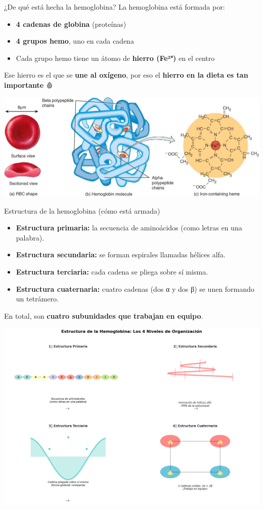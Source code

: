 \documentclass[
  ignorenonframetext,
]{beamer}
\providecommand{\tightlist}{%
  \setlength{\itemsep}{0pt}\setlength{\parskip}{0pt}}
\begin{document}
\begin{frame}{¿De qué está hecha la hemoglobina?}
\label{de-quuxe9-estuxe1-hecha-la-hemoglobina}
La hemoglobina está formada por:

\begin{itemize}
\tightlist
\item
  \textbf{4 cadenas de globina} (proteínas)
\item
  \textbf{4 grupos hemo}, uno en cada cadena
\item
  Cada grupo hemo tiene un átomo de \textbf{hierro (Fe²⁺)} en el centro
\end{itemize}

Ese hierro es el que se \textbf{une al oxígeno}, por eso el
\textbf{hierro en la dieta es tan importante} 🩸

\begin{center}
\includegraphics[width=0.45\linewidth,height=\textheight,keepaspectratio]{hemoglobina.jpg}
\end{center}
\end{frame}

\begin{frame}{Estructura de la hemoglobina (cómo está armada)}
\label{estructura-de-la-hemoglobina-cuxf3mo-estuxe1-armada}
\begin{itemize}
\tightlist
\item
  \textbf{Estructura primaria:} la secuencia de aminoácidos (como letras
  en una palabra).\\
\item
  \textbf{Estructura secundaria:} se forman espirales llamadas hélices
  alfa.\\
\item
  \textbf{Estructura terciaria:} cada cadena se pliega sobre sí misma.\\
\item
  \textbf{Estructura cuaternaria:} cuatro cadenas (dos α y dos β) se
  unen formando un tetrámero.
\end{itemize}

En total, son \textbf{cuatro subunidades que trabajan en equipo}.

\begin{center}
\includegraphics[width=0.4\linewidth,height=\textheight,keepaspectratio]{estructura.png}
\end{center}
\end{frame}
\end{document}
